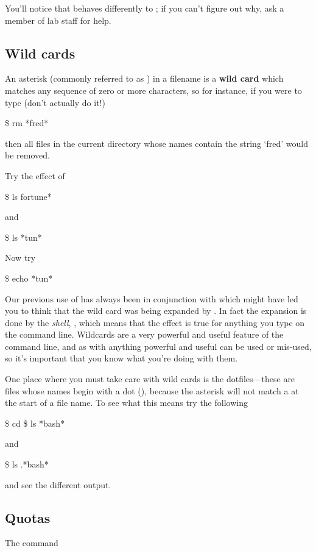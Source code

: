 You'll notice that  behaves differently to ; if you can't figure out why, ask a member of lab staff for help.

\subsection{Wild cards}
An asterisk (commonly referred to as ) in a filename is a \textbf{wild card} which matches any sequence of
zero or more characters, so for instance, if you were to type (don't
actually do it!)
%
\begin{ttoutenv}
\$  rm *fred*\return
\end{ttoutenv}
%
then all files in the current directory whose names contain the string
`fred' would be removed.

Try the effect of
%
\begin{ttoutenv}
\$  ls fortune*\return
\end{ttoutenv}
%
and
%
\begin{ttoutenv}
\$  ls *tun*\return
\end{ttoutenv}

Now try
%
\begin{ttoutenv}
\$  echo *tun*\return
\end{ttoutenv}
%
Our previous use of \ttout{*} has always been in conjunction with  which might have led you to think that the wild card was being expanded by . In fact the expansion is done by the \emph{shell}, , which means that the effect is true for anything you type on the command line. Wildcards are a very powerful and useful feature of the command line, and as with anything powerful and useful can be used or mis-used, so it's important that you know what you're doing with them.

One place where you must take care with wild cards is the dotfiles---these are files
whose names begin with a dot (), because the asterisk will not match a
 at the start of a file name. To see what this means try the following
\begin{ttoutenv}
\$  cd \return
\$  ls *bash* \return
\end{ttoutenv}
%
and
%
\begin{ttoutenv}
\$  ls .*bash*\return
\end{ttoutenv}
and see the different output.

\subsection{Quotas}
The command

